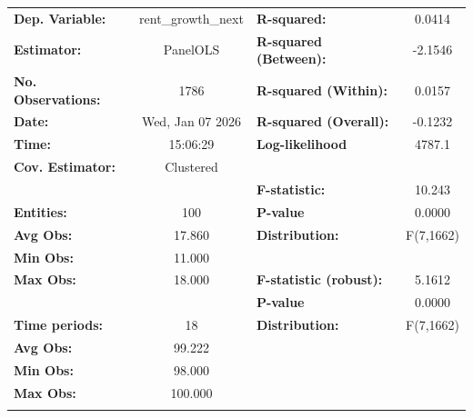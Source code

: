 \begin{center}
\begin{tabular}{lclc}
\toprule
\textbf{Dep. Variable:}            & rent\_growth\_next & \textbf{  R-squared:         }   &      0.0414      \\
\textbf{Estimator:}                &      PanelOLS      & \textbf{  R-squared (Between):}  &     -2.1546      \\
\textbf{No. Observations:}         &        1786        & \textbf{  R-squared (Within):}   &      0.0157      \\
\textbf{Date:}                     &  Wed, Jan 07 2026  & \textbf{  R-squared (Overall):}  &     -0.1232      \\
\textbf{Time:}                     &      15:06:29      & \textbf{  Log-likelihood     }   &      4787.1      \\
\textbf{Cov. Estimator:}           &     Clustered      & \textbf{                     }   &                  \\
\textbf{}                          &                    & \textbf{  F-statistic:       }   &      10.243      \\
\textbf{Entities:}                 &        100         & \textbf{  P-value            }   &      0.0000      \\
\textbf{Avg Obs:}                  &       17.860       & \textbf{  Distribution:      }   &    F(7,1662)     \\
\textbf{Min Obs:}                  &       11.000       & \textbf{                     }   &                  \\
\textbf{Max Obs:}                  &       18.000       & \textbf{  F-statistic (robust):} &      5.1612      \\
\textbf{}                          &                    & \textbf{  P-value            }   &      0.0000      \\
\textbf{Time periods:}             &         18         & \textbf{  Distribution:      }   &    F(7,1662)     \\
\textbf{Avg Obs:}                  &       99.222       & \textbf{                     }   &                  \\
\textbf{Min Obs:}                  &       98.000       & \textbf{                     }   &                  \\
\textbf{Max Obs:}                  &      100.000       & \textbf{                     }   &                  \\
\textbf{}                          &                    & \textbf{                     }   &                  \\

\end{tabular}
\end{center}
